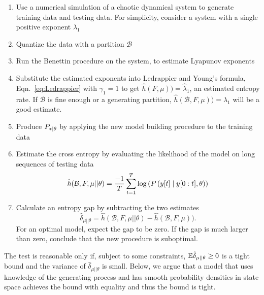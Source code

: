 \begin{enumerate}
\item \label{PPB1} Use a numerical simulation of a chaotic dynamical
  system to generate training data and testing data.  For simplicity,
  consider a system with a single positive exponent $\lambda_1$
\item \label{PPB2} Quantize the data with a partition $\mathcal{B}$
\item \label{PPB3} Run the Benettin procedure on the system, to
  estimate Lyapunov exponents
\item \label{PPB4} Substitute the estimated exponents into Ledrappier
  and Young's formula, Eqn.~\eqref{eq:Ledrappier} with $\gamma_1 = 1$
  to get $\hat h(F,\mu)) = \hat \lambda_1$, an estimated entropy rate.
  If $\mathcal{B}$ is fine enough or a generating partition,
  $\hat h(\mathcal{B},F,\mu)) = \hat \lambda_1$ will be a good
  estimate.
\item \label{PPB5} Produce $P_{*\mid \theta}$ by applying the new model building
  procedure to the training data
\item \label{PPB6} Estimate the cross entropy by evaluating the
  likelihood of the model on long sequences of testing data
  \begin{equation}
    \label{eq:ToyCE}
    \hat h(\mathcal{B},F,\mu||\theta) = \frac{-1}{T} \sum_{t=1}^T \log \left(
    P \left({y}{[t]}\mid y[0:t],\theta \right)\right)
  \end{equation}
\item \label{PPB7} Calculate an entropy gap  by
  subtracting the two estimates
  \begin{equation*}
    \hat \delta_{\mu||\theta} = \hat h(\mathcal{B},F,\mu||\theta)
    -\hat h(\mathcal{B},F,\mu)).
  \end{equation*}
  For an optimal model, expect the gap to be zero.  If the gap is much
  larger than zero, conclude that the new procedure is suboptimal.
\end{enumerate}
The test is reasonable only if, subject to some constraints, $\mathbb{E} \hat
\delta_{\mu||\theta} \geq 0$ is a tight bound and the variance of
$\hat \delta_{\mu||\theta}$ is small.  Below, we argue that a model
that uses knowledge of the generating process and has smooth
probability densities in state space achieves the bound with equality
and thus the bound is tight.

